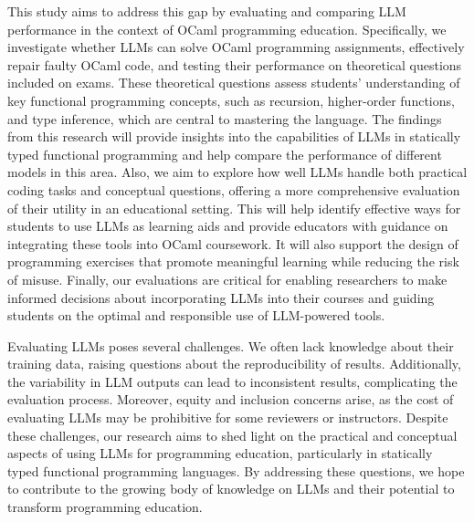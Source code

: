 This study aims to address this gap by evaluating and comparing LLM performance in the context of OCaml programming education. Specifically, we investigate whether LLMs can solve OCaml programming assignments, effectively repair faulty OCaml code, and testing their performance on theoretical questions included on exams. These theoretical questions assess students' understanding of key functional programming concepts, such as recursion, higher-order functions, and type inference, which are central to mastering the language. The findings from this research will provide insights into the capabilities of LLMs in statically typed functional programming and help compare the performance of different models in this area. Also, we aim to explore how well LLMs handle both practical coding tasks and conceptual questions, offering a more comprehensive evaluation of their utility in an educational setting. This will help identify effective ways for students to use LLMs as learning aids and provide educators with guidance on integrating these tools into OCaml coursework. It will also support the design of programming exercises that promote meaningful learning while reducing the risk of misuse. Finally, our evaluations are critical for enabling researchers to make informed decisions about incorporating LLMs into their courses and guiding students on the optimal and responsible use of LLM-powered tools.



Evaluating LLMs poses several challenges. We often lack knowledge about their training data, raising questions about the reproducibility of results. Additionally, the variability in LLM outputs can lead to inconsistent results, complicating the evaluation process. Moreover, equity and inclusion concerns arise, as the cost of evaluating LLMs may be prohibitive for some reviewers or instructors. Despite these challenges, our research aims to shed light on the practical and conceptual aspects of using LLMs for programming education, particularly in statically typed functional programming languages. By addressing these questions, we hope to contribute to the growing body of knowledge on LLMs and their potential to transform programming education.
